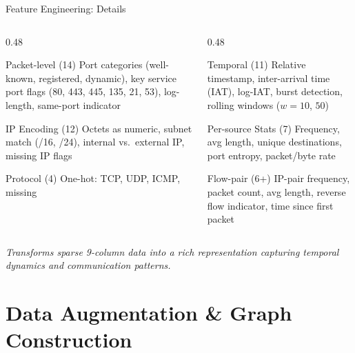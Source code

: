 \documentclass[aspectratio=169, 10pt]{beamer}
\begin{document}
\begin{frame}{Feature Engineering: Details}
\small
\begin{columns}[T]
\begin{column}{0.48\textwidth}
\begin{block}{Packet-level (14)}
Port categories (well-known, registered, dynamic), key service port flags (80, 443, 445, 135, 21, 53), log-length, same-port indicator
\end{block}
\begin{block}{IP Encoding (12)}
Octets as numeric, subnet match (/16, /24), internal vs.\ external IP, missing IP flags
\end{block}
\begin{block}{Protocol (4)}
One-hot: TCP, UDP, ICMP, missing
\end{block}
\end{column}
\begin{column}{0.48\textwidth}
\begin{block}{Temporal (11)}
Relative timestamp, inter-arrival time (IAT), log-IAT, burst detection, rolling windows ($w\!=\!10$, $50$)
\end{block}
\begin{block}{Per-source Stats (7)}
Frequency, avg length, unique destinations, port entropy, packet/byte rate
\end{block}
\begin{block}{Flow-pair (6+)}
IP-pair frequency, packet count, avg length, reverse flow indicator, time since first packet
\end{block}
\end{column}
\end{columns}
\vspace{0.3cm}
\centering
\textit{Transforms sparse 9-column data into a rich representation capturing temporal dynamics and communication patterns.}
\end{frame}

\section{Data Augmentation \& Graph Construction}
\end{document}
